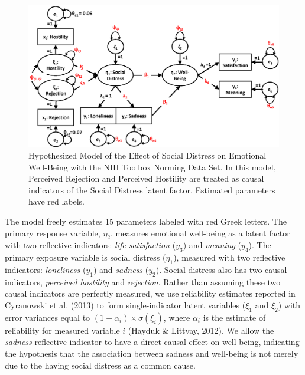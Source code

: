 \documentclass[
  english,
  man]{apa6}
\begin{document}
\begin{figure}

{\centering \includegraphics[width=0.8\linewidth]{toolboxDiagramPrimary} 

}

\caption{Hypothesized Model of the Effect of Social Distress on Emotional Well-Being with the NIH Toolbox Norming Data Set. In this model, Perceived Rejection and Perceived Hostility are treated as causal indicators of the Social Distress latent factor. Estimated parameters have red labels.}\label{fig:toolbox1}
\end{figure}

The model freely estimates 15 parameters labeled with red Greek letters. The primary response variable, \(\eta_{2}\), measures emotional well-being as a latent factor with two reflective indicators: \emph{life satisfaction} (\(y_3\)) and \emph{meaning} (\(y_4\)). The primary exposure variable is social distress (\(\eta_{1}\)), measured with two reflective indicators: \emph{loneliness} (\(y_1\)) and \emph{sadness} (\(y_2\)). Social distress also has two causal indicators, \emph{perceived hostility} and \emph{rejection}. Rather than assuming these two causal indicators are perfectly measured, we use reliability estimates reported in Cyranowski et al. (2013) to form single-indicator latent variables (\(\xi_1\) and \(\xi_2\)) with error variances equal to \((1-\alpha_i)\times \sigma(\xi_i)\), where \(\alpha_i\) is the estimate of reliability for measured variable \(i\) (Hayduk \& Littvay, 2012). We allow the \emph{sadness} reflective indicator to have a direct causal effect on well-being, indicating the hypothesis that the association between sadness and well-being is not merely due to the having social distress as a common cause.
\end{document}
